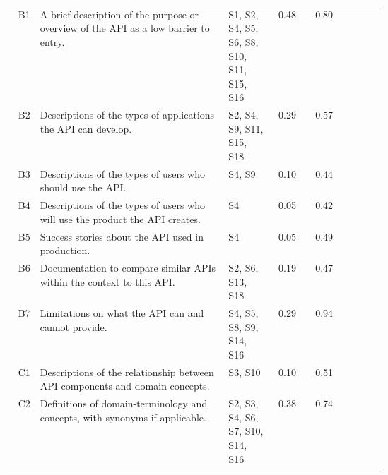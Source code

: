 {{\begin{landscape}
\begin{longtable}{rp{0.5\linewidth}|p{0.125\linewidth}|cc|ccc}
  \midrule
  
  {B1}&
  {A brief description of the purpose or overview of the API as a low barrier to entry.}
  &
  \scriptsize {S1, S2, S4, S5, S6, S8, S10, S11, S15, S16} &
  \cellcolor[HTML]{fdd666}0.48&\cellcolor[HTML]{8ac47f}0.80&\circlepresent{}&\circlepresent{}&\circlepresent{}\\

  B2&
  Descriptions of the types of applications the API can develop.
  &
  \scriptsize S2, S4, S9, S11, S15, S18 &
  \cellcolor[HTML]{f4ae6c}0.29&\cellcolor[HTML]{dcd16d}0.57&\circlepartialpresent{}&\circlepartialpresent{}&\circlepresent{}\\

  B3&
  Descriptions of the types of users who should use the API.
  &
  \scriptsize S4, S9 &
  \cellcolor[HTML]{e88672}0.10&\cellcolor[HTML]{fcce68}0.44&\circlepartialpresent{}&\circlenotpresent{}&\circlenotpresent{}\\


  B4&
  Descriptions of the types of users who will use the product the API creates.
  &
  \scriptsize S4 &
  \cellcolor[HTML]{e67c73}0.05&\cellcolor[HTML]{fccb68}0.42&\circlenotpresent{}&\circlenotpresent{}&\circlenotpresent{}\\


  B5&
  Success stories about the API used in production.
  &
  \scriptsize S4 &
  \cellcolor[HTML]{e67c73}0.05&\cellcolor[HTML]{f8d567}0.49&\circlepartialpresent{}&\circlepresent{}&\circlepresent{}\\


  B6&
  Documentation to compare similar APIs within the context to this API.
  &
  \scriptsize S2, S6, S13, S18 &
  \cellcolor[HTML]{ee9a6f}0.19&\cellcolor[HTML]{ffd666}0.47&\circlepartialpresent{}&\circlenotpresent{}&\circlepresent{}\\


  B7&
  Limitations on what the API can and cannot provide.
  &
  \scriptsize S4, S5, S8, S9, S14, S16 &
  \cellcolor[HTML]{f4ae6c}0.29&\cellcolor[HTML]{57bb8a}0.94&\circlenotpresent{}&\circlepresent{}&\circlepresent{}\\

  \midrule
  C1&
  Descriptions of the relationship between API components and domain concepts.
  &
  \scriptsize S3, S10 &
  \cellcolor[HTML]{e88672}0.10&\cellcolor[HTML]{f1d469}0.51&\circlenotpresent{}&\circlenotpresent{}&\circlepresent{}\\

  C2&
  Definitions of domain-terminology and concepts, with synonyms if applicable.
  &
  \scriptsize S2, S3, S4, S6, S7, S10, S14, S16 &
  \cellcolor[HTML]{f9c269}0.38&\cellcolor[HTML]{a1c77a}0.74&\circlepartialpresent{}&\circlenotpresent{}&\circlepartialpresent{}\\


\end{longtable}
\end{landscape}}}
